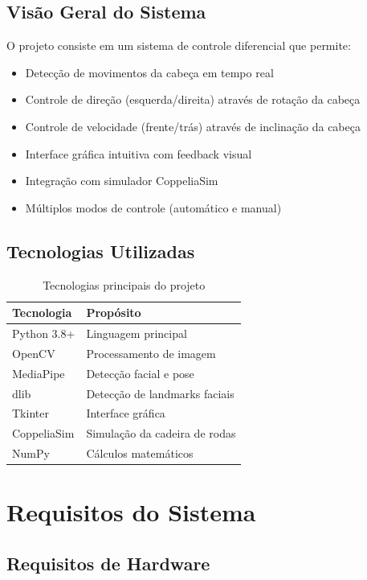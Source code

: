 \documentclass[12pt,a4paper]{article}
\begin{document}
\subsection{Visão Geral do Sistema}

O projeto consiste em um sistema de controle diferencial que permite:

\begin{itemize}
    \item Detecção de movimentos da cabeça em tempo real
    \item Controle de direção (esquerda/direita) através de rotação da cabeça
    \item Controle de velocidade (frente/trás) através de inclinação da cabeça
    \item Interface gráfica intuitiva com feedback visual
    \item Integração com simulador CoppeliaSim
    \item Múltiplos modos de controle (automático e manual)
\end{itemize}

\subsection{Tecnologias Utilizadas}

\begin{table}[H]
\centering
\begin{tabular}{|l|l|}
\hline
\textbf{Tecnologia} & \textbf{Propósito} \\
\hline
Python 3.8+ & Linguagem principal \\
OpenCV & Processamento de imagem \\
MediaPipe & Detecção facial e pose \\
dlib & Detecção de landmarks faciais \\
Tkinter & Interface gráfica \\
CoppeliaSim & Simulação da cadeira de rodas \\
NumPy & Cálculos matemáticos \\
\hline
\end{tabular}
\caption{Tecnologias principais do projeto}
\end{table}

\section{Requisitos do Sistema}

\subsection{Requisitos de Hardware}
\end{document}
